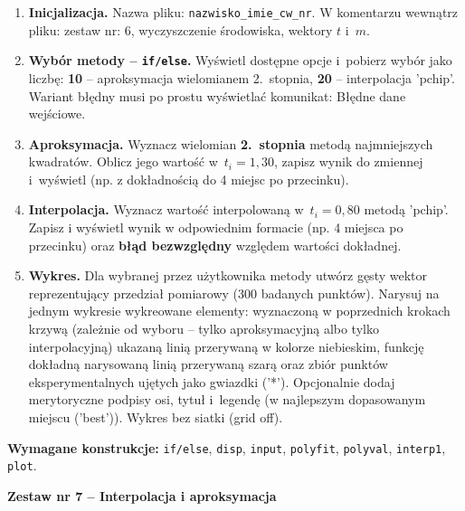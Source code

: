 \documentclass[a4paper,11pt]{article}
\begin{document}
\begin{enumerate}[leftmargin=*, label=\textbf{\arabic*.}, itemsep=2pt]

  \item \textbf{Inicjalizacja.}
    Nazwa pliku: \texttt{nazwisko\_imie\_cw\_nr}. W komentarzu wewnątrz pliku: zestaw nr: 6, wyczyszczenie środowiska, wektory $t$ i~$m$.

  \item \textbf{Wybór metody -- \texttt{if/else}.}
    Wyświetl dostępne opcje i~pobierz wybór jako liczbę: \textbf{10} -- aproksymacja wielomianem 2.~stopnia, \textbf{20} -- interpolacja 'pchip'. Wariant błędny musi po prostu wyświetlać komunikat: Błędne dane wejściowe.

  \item \textbf{Aproksymacja.}
    Wyznacz wielomian \textbf{2.~stopnia} metodą najmniejszych kwadratów. Oblicz jego wartość w~$t_i = 1{,}30$, zapisz wynik do zmiennej i~wyświetl (np. z dokładnością do 4 miejsc po przecinku).

  \item \textbf{Interpolacja.}
    Wyznacz wartość interpolowaną w~$t_i = 0{,}80$ metodą 'pchip'. Zapisz i wyświetl wynik w odpowiednim formacie (np. 4 miejsca po przecinku) oraz \textbf{błąd bezwzględny} względem wartości dokładnej.

  \item \textbf{Wykres.}
    Dla wybranej przez użytkownika metody utwórz gęsty wektor reprezentujący przedział pomiarowy (300 badanych punktów). Narysuj na jednym wykresie wykreowane elementy: wyznaczoną w poprzednich krokach krzywą (zależnie od wyboru -- tylko aproksymacyjną albo tylko interpolacyjną) ukazaną linią przerywaną w kolorze niebieskim, funkcję dokładną narysowaną linią przerywaną szarą oraz zbiór punktów eksperymentalnych ujętych jako gwiazdki ('*'). Opcjonalnie dodaj merytoryczne podpisy osi, tytuł i~legendę (w najlepszym dopasowanym miejscu ('best')). Wykres bez siatki (grid off).

\end{enumerate}

\vspace{0.3cm}
\begin{ramka}
\textbf{Wymagane konstrukcje:}
\texttt{if/else}, \texttt{disp}, \texttt{input}, \texttt{polyfit}, \texttt{polyval}, \texttt{interp1}, \texttt{plot}.
\end{ramka}

\clearpage
\begin{center}
  {\large\bfseries Zestaw nr 7 \quad -- \quad Interpolacja i aproksymacja}
\end{center}
\hrulefill
\vspace{0.4cm}
\end{document}

